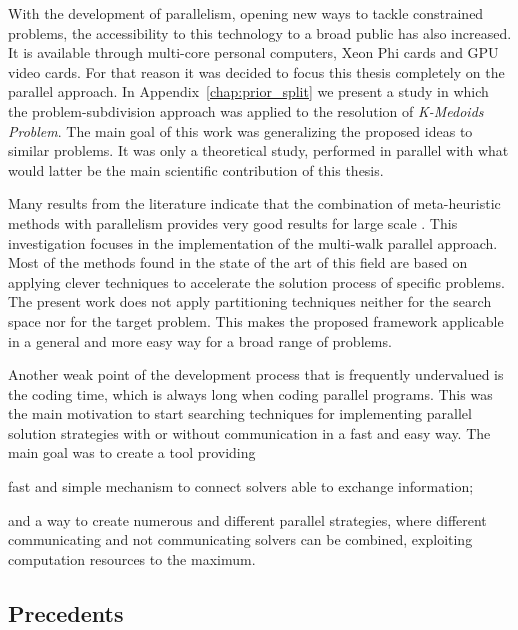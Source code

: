 With the development of parallelism, opening new ways to tackle constrained problems, the accessibility to this technology to a broad public has also increased. It is available through multi-core personal computers, Xeon Phi cards and GPU video cards. For that reason it was decided to focus this thesis completely on the parallel approach. In Appendix~\ref{chap:prior_split} we present a study in which the problem-subdivision approach was applied to the resolution of {\it K-Medoids Problem}. The main goal of this work was generalizing the proposed ideas to similar problems. It was only a theoretical study, performed in parallel with what would latter be the main scientific contribution of this thesis.

Many results from the literature indicate that the combination of meta-heuristic methods with parallelism provides very good results for large scale \csps. This investigation focuses in the implementation of the multi-walk parallel approach. Most of the methods found in the state of the art of this field are based on applying clever techniques to accelerate the solution process of specific problems. The present work does not apply partitioning techniques neither for the search space nor for the target problem. This makes the proposed framework applicable in a general and more easy way for a broad range of problems.

Another weak point of the development process that is frequently undervalued is the coding time, which is always long when coding parallel programs. This was the main motivation to start searching techniques for implementing parallel solution strategies with or without communication in a fast and easy way. The main goal was to create a tool providing 
\begin{inparaenum}[1-]
\item fast and simple mechanism to connect solvers able to exchange information; 
\item and a way to create numerous and different parallel strategies, where different communicating and not communicating solvers can be combined, exploiting computation resources to the maximum.
\end{inparaenum}

\subsection{Precedents}

